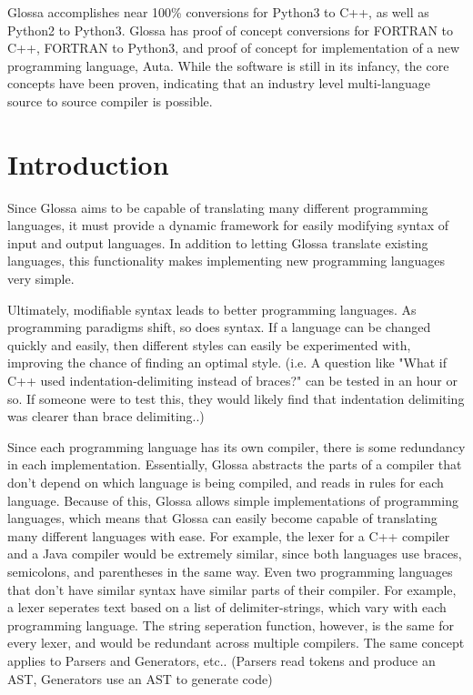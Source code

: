 \documentclass{article}
\begin{document}
Glossa accomplishes near 100\% conversions for Python3 to C++, as well as Python2 to Python3.
Glossa has proof of concept conversions for FORTRAN to C++, FORTRAN to Python3, and proof of concept for implementation of a new programming language, Auta.
While the software is still in its infancy, the core concepts have been proven, indicating that an industry level multi-language source to source compiler is possible.

\section{Introduction}

Since Glossa aims to be capable of translating many different programming languages, it must provide a dynamic framework for easily modifying syntax of input and output languages. 
In addition to letting Glossa translate existing languages, this functionality makes implementing new programming languages very simple.

Ultimately, modifiable syntax leads to better programming languages.
As programming paradigms shift, so does syntax. 
If a language can be changed quickly and easily, then different styles can easily be experimented with, improving the chance of finding an optimal style.
(i.e. A question like "What if C++ used indentation-delimiting instead of braces?" can be tested in an hour or so. If someone were to test this, they would likely find that indentation delimiting was clearer than brace delimiting..)

Since each programming language has its own compiler, there is some redundancy in each implementation. 
Essentially, Glossa abstracts the parts of a compiler that don't depend on which language is being compiled, and reads in rules for each language.
Because of this, Glossa allows simple implementations of programming languages, which means that Glossa can easily become capable of translating many different languages with ease.
For example, the lexer for a C++ compiler and a Java compiler would be extremely similar, since both languages use braces, semicolons, and parentheses in the same way.
Even two programming languages that don't have similar syntax have similar parts of their compiler. 
For example, a lexer seperates text based on a list of delimiter-strings, which vary with each programming language. The string seperation function, however, is the same for every lexer, and would be redundant across multiple compilers.
The same concept applies to Parsers and Generators, etc.. (Parsers read tokens and produce an AST, Generators use an AST to generate code)
\end{document}
